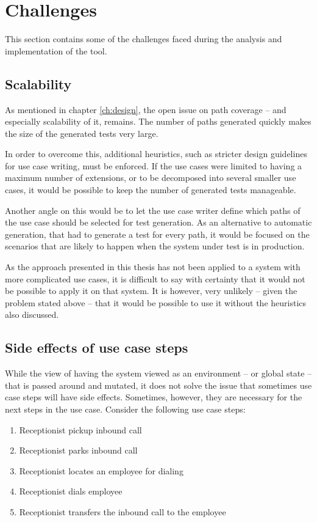 \section{Challenges}
This section contains some of the challenges faced during the analysis and implementation of the tool.
\subsection{Scalability}
\label{sec:scalability}
As mentioned in chapter \ref{ch:design}, the open issue on path coverage -- and especially scalability of it, remains. The number of paths generated quickly makes the size of the generated tests very large.\medskip

\noindent In order to overcome this, additional heuristics, such as stricter design guidelines for use case writing, must be enforced. If the use cases were limited to having a maximum number of extensions, or to be decomposed into several smaller use cases, it would be possible to keep the number of generated tests manageable.\medskip

\noindent Another angle on this would be to let the use case writer define which paths of the use case should be selected for test generation. As an alternative to automatic generation, that had to generate a test for every path, it would be focused on the scenarios that are likely to happen when the system under test is in production.\medskip

\noindent As the approach presented in this thesis has not been applied to a system with more complicated use cases, it is difficult to say with certainty that it would not be possible to apply it on that system. It is however, very unlikely -- given the problem stated above -- that it would be possible to use it without the heuristics also discussed.

\subsection{Side effects of use case steps}
While the view of having the system viewed as an environment -- or global state -- that is passed around and mutated, it does not solve the issue that sometimes use case steps will have side effects. Sometimes, however, they are necessary for the next steps in the use case. Consider the following use case steps:

\begin{enumerate}
 \item Receptionist pickup inbound call
 \item Receptionist parks inbound call
 \item Receptionist locates an employee for dialing
 \item Receptionist dials employee
 \item Receptionist transfers the inbound call to the employee
\end{enumerate}

